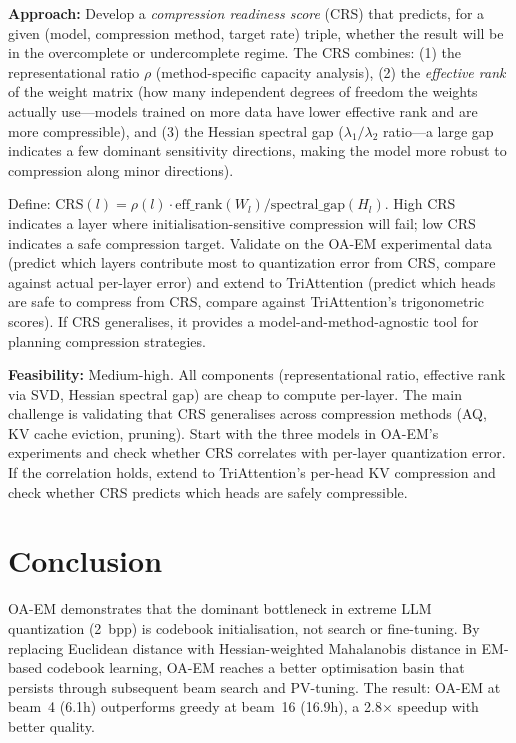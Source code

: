 \documentclass[11pt]{article}
\begin{document}
\textbf{Approach:} Develop a \textit{compression readiness score} (CRS) that predicts, for a given (model, compression method, target rate) triple, whether the result will be in the overcomplete or undercomplete regime. The CRS combines: (1) the representational ratio $\rho$ (method-specific capacity analysis), (2) the \textit{effective rank} of the weight matrix (how many independent degrees of freedom the weights actually use---models trained on more data have lower effective rank and are more compressible), and (3) the Hessian spectral gap ($\lambda_1 / \lambda_2$ ratio---a large gap indicates a few dominant sensitivity directions, making the model more robust to compression along minor directions).

Define: $\mathrm{CRS}(l) = \rho(l) \cdot \mathrm{eff\_rank}(W_l) / \mathrm{spectral\_gap}(H_l)$. High CRS indicates a layer where initialisation-sensitive compression will fail; low CRS indicates a safe compression target. Validate on the OA-EM experimental data (predict which layers contribute most to quantization error from CRS, compare against actual per-layer error) and extend to TriAttention (predict which heads are safe to compress from CRS, compare against TriAttention's trigonometric scores). If CRS generalises, it provides a model-and-method-agnostic tool for planning compression strategies.

\textbf{Feasibility:} Medium-high. All components (representational ratio, effective rank via SVD, Hessian spectral gap) are cheap to compute per-layer. The main challenge is validating that CRS generalises across compression methods (AQ, KV cache eviction, pruning). Start with the three models in OA-EM's experiments and check whether CRS correlates with per-layer quantization error. If the correlation holds, extend to TriAttention's per-head KV compression and check whether CRS predicts which heads are safely compressible.

\section{Conclusion}

OA-EM demonstrates that the dominant bottleneck in extreme LLM quantization (2~bpp) is codebook initialisation, not search or fine-tuning. By replacing Euclidean distance with Hessian-weighted Mahalanobis distance in EM-based codebook learning, OA-EM reaches a better optimisation basin that persists through subsequent beam search and PV-tuning. The result: OA-EM at beam~4 (6.1h) outperforms greedy at beam~16 (16.9h), a 2.8$\times$ speedup with better quality.
\end{document}
